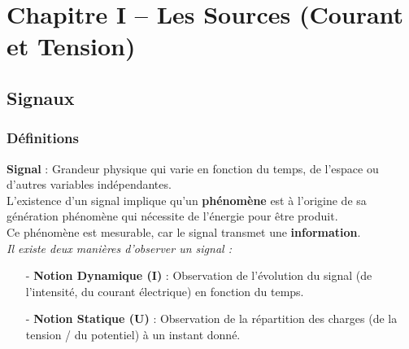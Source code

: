 \chapter{Chapitre I -- Les Sources (Courant et Tension)}

\section{Signaux}

\subsection{Définitions}
\textbf{Signal} : Grandeur physique qui varie en fonction du temps, de l'espace ou d'autres variables indépendantes. \\
\vspace{5px}
L'existence d'un signal implique qu'un \textbf{phénomène} est à l'origine de sa génération phénomène qui nécessite de l'énergie pour être produit. \\ 
Ce phénomène est mesurable, car le signal transmet une \textbf{information}. \\
\vspace{5px}
\textit{Il existe deux manières d'observer un signal :}
\vspace{5px}
\begin{itemize}
    \item[-] \textbf{Notion Dynamique (I)} : Observation de l'évolution du signal (de l'intensité, du courant électrique) en fonction du temps.
    \item[-] \textbf{Notion Statique (U)} : Observation de la répartition des charges (de la tension / du potentiel) à un instant donné.
\end{itemize}
\vspace{15px}
